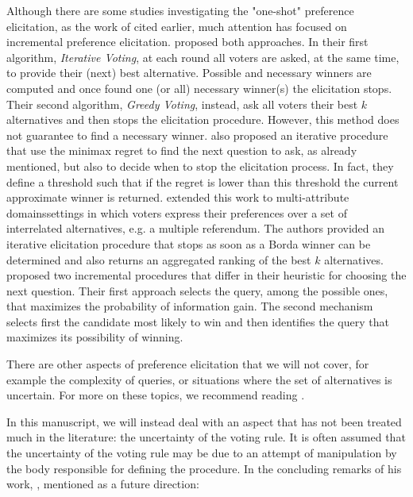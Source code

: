 Although there are some studies investigating the "one-shot" preference elicitation, as the work of \citet{Lu2011Prob} cited earlier, much attention has focused on incremental preference elicitation.
\citet{Kalech2011} proposed both approaches. In their first algorithm, \textit{Iterative Voting}, at each round all voters are asked, at the same time, to provide their (next) best alternative. Possible and necessary winners are computed and once found one (or all) necessary winner(s) the elicitation stops. Their second algorithm, \textit{Greedy Voting}, instead, ask all voters their best $k$ alternatives and then stops the elicitation procedure. However, this method does not guarantee to find a necessary winner.
\citet{Lu2011} also proposed an iterative procedure that use the minimax regret to find the next question to ask, as already mentioned, but also to decide when to stop the elicitation process. In fact, they define a threshold such that if the regret is lower than this threshold the current approximate winner is returned.
\citet{Benabbou2016} extended this work to multi-attribute domains\textemdash settings in which voters express their preferences over a set of interrelated alternatives, e.g. a multiple referendum. The authors provided an iterative elicitation procedure that stops as soon as a Borda winner can be determined and also returns an aggregated ranking of the best $k$ alternatives.
\citet{Naamani-Dery2015} proposed two incremental procedures that differ in their heuristic for choosing the next question. Their first approach selects the query, among the possible ones, that maximizes the probability of information gain. The second mechanism selects first the candidate most likely to win and then identifies the query that maximizes its possibility of winning.

There are other aspects of preference elicitation that we will not cover, for example the complexity of queries, or situations where the set of alternatives is uncertain. For more on these topics, we recommend reading \citet[Ch. 10]{Comsoc2016}.

In this manuscript, we will instead deal with an aspect that has not been treated much in the literature: the uncertainty of the voting rule. It is often assumed that the uncertainty of the voting rule may be due to an attempt of manipulation by the body responsible for defining the procedure. In the concluding remarks of his work, \citet{Walsh2007}, mentioned as a future direction:

\textit{}

